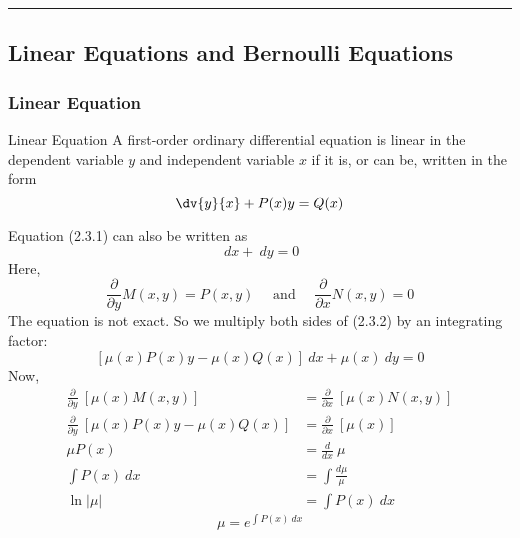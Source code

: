 \vspace{20pt}\rule{3in}{1pt}
\subsection{Linear Equations and Bernoulli Equations}


\subsubsection{Linear Equation}
\begin{definition}{Linear Equation}{}
    A first-order ordinary differential equation is linear in the dependent variable $y$ and independent variable $x$ if it is, or can be, written in the form
    \begin{equation}
        \dv{y}{x} + P(x)y = Q(x)
    \end{equation}
\end{definition}
 Equation (2.3.1) can also be written as
    \begin{equation}
        [P(x)y - Q(x)] \: d{x} + \: d{y} = 0 
    \end{equation}
 Here, \[
     \frac{\partial}{\partial{y}} M(x,y) = P(x,y) \quad\text{ and }\quad \frac{\partial}{\partial{x}} N(x,y) = 0
 \]
 The equation is not exact. So we multiply both sides of (2.3.2) by an integrating factor: \[
     [\mu(x)P(x)y - \mu(x)Q(x)] \: d{x} + \mu(x) \: d{y} = 0
 \]
 Now,
\begin{align*}
    \frac{\partial}{\partial{y}} \: \left[\mu(x)M(x,y)\right] &= \frac{\partial}{\partial{x}} \: \left[\mu(x)N(x,y)\right] \\
    \frac{\partial}{\partial{y}} \: \left[\mu(x)P(x)y - \mu(x)Q(x)\right] &= \frac{\partial}{\partial{x}} \: \left[\mu(x)\right] \\
    \mu P(x) &= \frac{d}{dx} \: \mu \\
    \int{P(x)} \: d{x} &= \int{ \frac{d\mu}{\mu} } \\
    \ln|\mu| &= \int{P(x)} \: d{x}
\end{align*}
\[ \boxed{ \mu = e^{\int{ P(x) } \: d{x} } } \]

